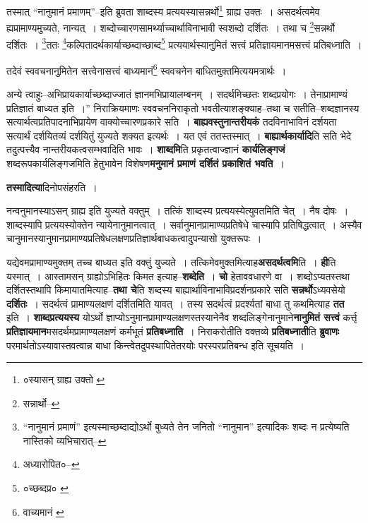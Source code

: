\documentclass[article,12pt,a4paper]{memoir}
\begin{document}
	तस्मात् “नानुमानं प्रमाणम्”--इति ब्रुवता शाब्दस्य प्रत्ययस्यासन्नर्थो\footnote{०स्यासन् ग्राह्य उक्तो \cite{dp-msA} \cite{dp-edP} \cite{dp-edH} \cite{dp-edN}} ग्राह्य उक्तः । असदर्थत्वमेव ह्यप्रामाण्यमुच्यते, नान्यत् । शब्दोच्चारणसामर्थ्याच्चार्थाविनाभावी स्वशब्दो दर्शितः । तथा च \footnote{सन्नार्थो--\cite{dp-edE}}सन्नर्थो दर्शितः । \footnote{“नानुमानं प्रमाणं” इत्यस्माच्छब्दाद्योऽर्थो बुध्यते तेन जनितो “नानुमान” इत्यादिकः शब्दः न प्रत्येष्यति नास्तिको व्यभिचारात्--\cite{dp-msD-n}}ततः \footnote{अध्यारोपित०--\cite{dp-msD-n}}कल्पितादर्थकार्याच्छब्दाच्छाब्द\footnote{०च्छब्दप्र० \cite{dp-msA}} प्रत्ययार्थस्यानुमितं सत्त्वं प्रतिज्ञायमानमसत्त्वं प्रतिबध्नाति । 
	  
	तदेवं स्ववचनानुमितेन सत्त्वेनासत्त्वं बाध्यमानं\footnote{वाच्यमानं \cite{dp-msA} \cite{dp-msB} \cite{dp-edP} \cite{dp-edH} \cite{dp-edE} \cite{dp-edN}} स्ववचनेन बाधितमुक्तमित्ययमत्रार्थः । 
	  
	अन्ये त्वाहुः--अभिप्रायकार्याच्छब्दाज्जातं ज्ञानमभिप्रायालम्बनम् । सदर्थमिच्छतः शब्दप्रयोगः । तेनाप्रामाण्यं प्रतिज्ञातं बाध्यत इति ।” निराक्रियमाणः स्ववचननिराकृतो भवतीत्याशङ्क्याह--तथा च सतीति--शब्दज्ञानस्य सत्यार्थत्वप्रतिपादनाभिप्रायेण वाक्योच्चारणप्रकारे सति । \textbf{बाह्यवस्तुनान्तरीयकं} तदविनाभाविनं दर्शयता सत्यार्थं दर्शयितव्यं दर्शयितुं युज्यते शक्यत इत्यर्थः । यत एवं ततस्तस्मात् । \textbf{बाह्यार्थकार्यादि}ति सति भेदे तदुत्पत्त्यैव नान्तरीयकत्वसम्भवादिति भावः । \textbf{शाब्दमि}ति प्रकृतत्वाज्ज्ञानं \textbf{कार्यलिङ्गजं} शब्दरूपकार्यलिङ्गजमिति हेतुभावेन विशेषण\textbf{मनुमानं प्रमाणं दर्शितं प्रकाशितं भवति} ।
	\pend
      

	  \pstart \textbf{तस्मादित्या}दिनोपसंहरति ।
	\pend
      

	  \pstart नन्वनुमानस्याऽसन् ग्राह्य इति युज्यते वक्तुम् । तत्किं शाब्दस्य प्रत्ययस्येत्युवतमिति चेत् । नैष दोषः । शाब्दस्यापि प्रत्ययस्योक्तेन न्यायेनानुमानत्वात् । सर्वानुमानप्रामाण्यप्रतिषेधे चास्यापि प्रतिषिद्धत्वात् । अस्यैव चानुमानस्यानुमानप्रामाण्यप्रतिषेधलक्षणप्रतिज्ञार्थबाधकत्वादुपन्यासो युक्तरूपः ।
	\pend
      

	  \pstart यद्येवमप्रामाण्यमुक्तम् तच्च बाध्य\leavevmode{}त इति वक्तुं युज्यते । तत्किमेवमुक्तमित्याह\textbf{असदर्थत्वमि}ति । \textbf{ही}ति यस्मात् । आस्तामसन् ग्राह्योऽभिहितः किमत इत्याह--\textbf{शब्देति} । \textbf{चो} हेताववधारणे वा । शब्दोऽप्यतस्तथा दर्शितस्तथापि किमायातमित्याह--\textbf{तथा चे}ति शब्दस्य बाह्यार्थाविनाभाविप्रदर्शनप्रकारे सति \textbf{सन्नर्थो}ऽध्यवसेयो \textbf{दर्शितः} । सदर्थत्वं प्रामाण्यलक्षणं दर्शितमिति यावत् । तस्य सदर्थत्वं प्रदर्श्यतां बाधा तु कथमित्याह \textbf{तत} इति । \textbf{शाब्दप्रत्ययस्य} योऽर्थो ज्ञाप्योऽनुमानप्रामाण्यलक्षणस्तस्यानेनैव शब्दलिङ्गेनानुमाने\textbf{नानुमितं सत्त्वं} कर्त्तृ \textbf{प्रतिज्ञायमान}मसदर्थमप्रामाण्यलक्षणं कर्मभूतं \textbf{प्रतिबध्नाति} । निराकरोतीति वक्तव्ये \textbf{प्रतिबध्नाती}ति \textbf{ब्रुवाणः} परमार्थतोऽस्यावास्तवत्वान्न बाधा किन्त्वेतदुपस्थापितेतरयोः परस्परप्रतिबन्ध इति सूचयति ।
	\pend
      \leavevmode{}
	  \bigskip
	  \begingroup
	
\end{document}

